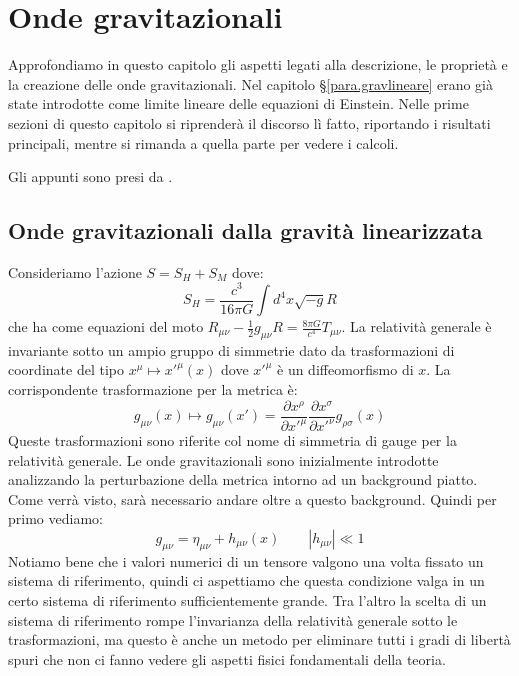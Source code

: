 \chapter{Onde gravitazionali}
Approfondiamo in questo capitolo gli aspetti legati alla descrizione, le proprietà e la creazione delle onde gravitazionali.
Nel capitolo \S\ref{para.gravlineare} erano già state introdotte come limite lineare delle equazioni di Einstein. Nelle prime sezioni di questo capitolo si riprenderà il discorso lì fatto, riportando i risultati principali, mentre si rimanda a quella parte per vedere i calcoli.

Gli appunti sono presi da \cite{maggiore_gw}.

\section{Onde gravitazionali dalla gravità linearizzata}
Consideriamo l'azione $S =S_{H} + S_M$ dove:
\begin{equation*}
    S_{H} = \frac{c^3}{16\pi G}\int d^4 x \sqrt{-g}R
\end{equation*}
che ha come equazioni del moto $R_{\mu\nu} - \frac{1}{2}g_{\mu\nu}R = \frac{8\pi G}{c^4}T_{\mu\nu}$. La relatività generale è invariante sotto un ampio gruppo di simmetrie dato da trasformazioni di coordinate del tipo $x^\mu \mapsto x'^\mu(x)$ dove $x'^\mu$ è un diffeomorfismo di $x$. La corrispondente trasformazione per la metrica è:
\begin{equation*}
    g_{\mu\nu}(x) \mapsto g_{\mu\nu}(x') = \frac{\partial x^\rho}{\partial x'^\mu} \frac{\partial x^\sigma}{\partial x'^\nu}g_{\rho\sigma}(x)
\end{equation*}
Queste trasformazioni sono riferite col nome di simmetria di gauge per la relatività generale. Le onde gravitazionali sono inizialmente introdotte analizzando la perturbazione della metrica intorno ad un background piatto. Come verrà visto, sarà necessario andare oltre a questo background. Quindi per primo vediamo:
\begin{equation*}
    g_{\mu\nu} = \eta_{\mu\nu} + h_{\mu\nu}(x) \qquad |h_{\mu\nu}| \ll 1    
\end{equation*}
Notiamo bene che i valori numerici di un tensore valgono una volta fissato un sistema di riferimento, quindi ci aspettiamo che questa condizione valga  in un certo sistema di riferimento sufficientemente grande. Tra l'altro la scelta di un sistema di riferimento rompe l'invarianza della relatività generale sotto le trasformazioni, ma questo è anche un metodo per eliminare tutti i gradi di libertà spuri che non ci fanno vedere gli aspetti fisici fondamentali della teoria.

